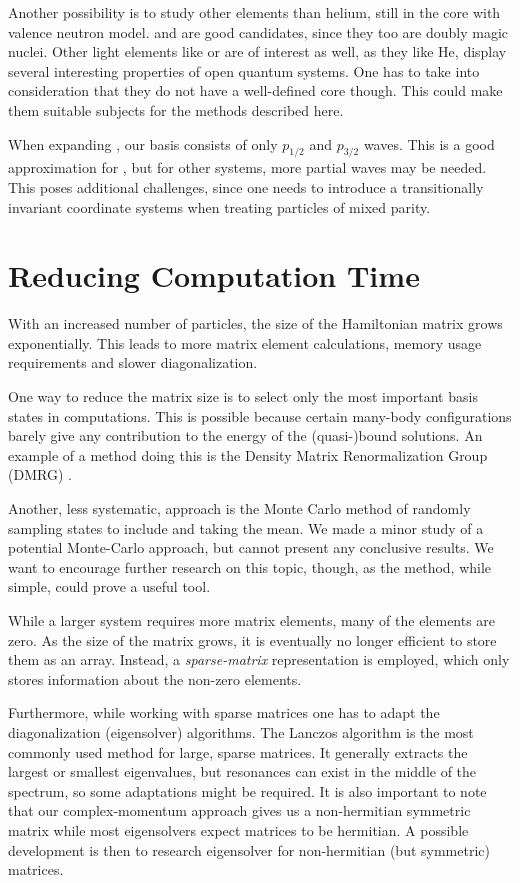 \documentclass[../main/report.tex]{subfiles}
\begin{document}
Another possibility is to study other elements than helium, still in the core with valence neutron model.  and  are good candidates, since they too are doubly magic nuclei.
Other light elements like  or  are of interest as well, as they like He, display several interesting properties of open quantum systems. One has to take into consideration that they do not have a well-defined core though. 
This could make them suitable subjects for the methods described here.

When expanding , our basis consists of only $p_{1/2}$ and $p_{3/2}$ waves. 
This is a good approximation for  \cite{gamow_shell_model_2008},  but for other systems, more partial waves may be needed.
This poses additional challenges, since one needs to introduce a transitionally invariant coordinate systems when treating particles of mixed parity. 

\section{Reducing Computation Time}
With an increased number of particles, the size of the Hamiltonian matrix grows exponentially. This leads to more matrix element calculations, memory usage requirements and slower diagonalization.

One way to reduce the matrix size is to select only the most important basis states in computations.
This is possible because certain many-body configurations barely give any contribution to the energy of the (quasi-)bound solutions. 
An example of a method doing this is the Density Matrix Renormalization Group (DMRG) \cite{DMRG}.


Another, less systematic, approach is the Monte Carlo method of randomly sampling states to include and taking the mean.
We made a minor study of a potential Monte-Carlo approach, but cannot present any conclusive results.
We want to encourage further research on this topic, though, as the method, while simple, could prove a useful tool.

While a larger system requires more matrix elements, many of the elements are zero. 
As the size of the matrix grows, it is eventually no longer efficient to store them as an array. 
Instead, a \emph{sparse-matrix} representation is employed, which only stores information about the non-zero elements. 

Furthermore, while working with sparse matrices one has to adapt the diagonalization (eigensolver) algorithms. 
The Lanczos algorithm is the most commonly used method for large, sparse matrices.
It generally extracts the largest or smallest eigenvalues, but resonances can exist in the middle of the spectrum, so some adaptations might be required.
It is also important to note that our complex-momentum approach gives us a non-hermitian symmetric matrix while most eigensolvers expect matrices to be hermitian. A possible development is then to research eigensolver for non-hermitian (but symmetric) matrices.
\end{document}
